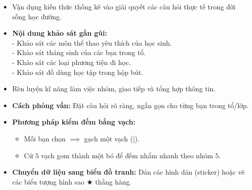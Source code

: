 \documentclass[10pt,a4paper]{article}
\begin{document}
\noindent
\begin{minipage}[t]{0.49\textwidth}\vspace{0pt}
\begin{tcolorbox}[
  enhanced,
  colback=violet!4!white,
  colframe=violet!75!black,
  arc=2mm, boxrule=0.8pt,
  left=2mm, right=2mm, top=1.8mm, bottom=1.8mm,
  title={\footnotesize\bfseries\color{white}\faKey\ 1. Mục tiêu hoạt động trải nghiệm}
]
{\footnotesize
\begin{itemize}\setlength{\itemsep}{1pt}\setlength{\leftskip}{-2.5mm}
  \item Vận dụng kiến thức thống kê vào giải quyết các câu hỏi thực tế trong đời sống học đường.
  \item \textbf{Nội dung khảo sát gần gũi:}\\
  - Khảo sát các môn thể thao yêu thích của học sinh.\\
  - Khảo sát tháng sinh của các bạn trong tổ.\\
  - Khảo sát các loại phương tiện đi học.\\
  - Khảo sát đồ dùng học tập trong hộp bút.
  \item Rèn luyện kĩ năng làm việc nhóm, giao tiếp và tổng hợp thông tin.
\end{itemize}
}
\end{tcolorbox}
\end{minipage}
\hfill
\begin{minipage}[t]{0.49\textwidth}\vspace{0pt}
\begin{tcolorbox}[
  enhanced,
  colback=teal!4!white,
  colframe=teal!75!black,
  arc=2mm, boxrule=0.8pt,
  left=2mm, right=2mm, top=1.8mm, bottom=1.8mm,
  title={\footnotesize\bfseries\color{white}\faSliders\ 2. Kĩ năng phỏng vấn và kiểm đếm}
]
{\footnotesize
\begin{itemize}\setlength{\itemsep}{1pt}\setlength{\leftskip}{-2.5mm}
  \item \textbf{Cách phỏng vấn:} Đặt câu hỏi rõ ràng, ngắn gọn cho từng bạn trong tổ/lớp.
  \item \textbf{Phương pháp kiểm đếm bằng vạch:}
  \begin{itemize}\setlength{\itemsep}{0.5pt}\setlength{\leftskip}{-2mm}
    \item Mỗi bạn chọn $\implies$ gạch một vạch ($|$).
    \item Cứ $5$ vạch gom thành một bó để đếm nhẩm nhanh theo nhóm $5$.
  \end{itemize}
  \item \textbf{Chuyển dữ liệu sang biểu đồ tranh:} Dán các hình dán (sticker) hoặc vẽ các biểu tượng hình sao $\bigstar$ thẳng hàng.
\end{itemize}
}
\end{tcolorbox}
\end{minipage}
\end{document}

